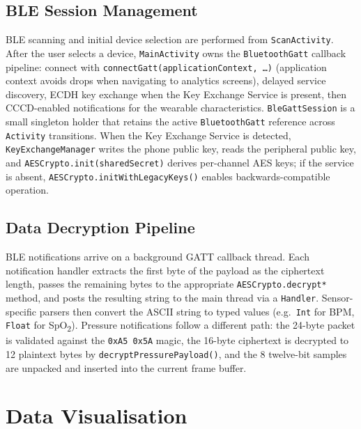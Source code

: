 \subsection{BLE Session Management}
\label{subsec:android_ble}

BLE scanning and initial device selection are performed from \texttt{ScanActivity}.  After the
user selects a device, \texttt{MainActivity} owns the \texttt{BluetoothGatt} callback pipeline:
connect with \texttt{connectGatt(applicationContext, \ldots)} (application context avoids drops when
navigating to analytics screens), delayed service discovery, ECDH key exchange when the Key Exchange
Service is present, then CCCD-enabled notifications for the wearable characteristics.
\texttt{BleGattSession} is a small singleton holder that retains the active \texttt{BluetoothGatt}
reference across \texttt{Activity} transitions.  When the Key Exchange Service is detected,
\texttt{KeyExchangeManager} writes the phone public key, reads the peripheral public key, and
\texttt{AESCrypto.init(sharedSecret)} derives per-channel AES keys; if the service is absent,
\texttt{AESCrypto.initWithLegacyKeys()} enables backwards-compatible operation.

\subsection{Data Decryption Pipeline}
\label{subsec:android_decrypt}

BLE notifications arrive on a background GATT callback thread.  Each notification handler
extracts the first byte of the payload as the ciphertext length, passes the remaining bytes to
the appropriate \texttt{AESCrypto.decrypt*} method, and posts the resulting string to the main
thread via a \texttt{Handler}.  Sensor-specific parsers then convert the ASCII string to typed
values (e.g.\ \texttt{Int} for BPM, \texttt{Float} for SpO\textsubscript{2}).  Pressure
notifications follow a different path: the 24-byte packet is validated against the
\texttt{0xA5~0x5A} magic, the 16-byte ciphertext is decrypted to 12 plaintext bytes by
\texttt{decryptPressurePayload()}, and the 8 twelve-bit samples are unpacked and inserted into
the current frame buffer.

\section{Data Visualisation}
\label{sec:viz}

